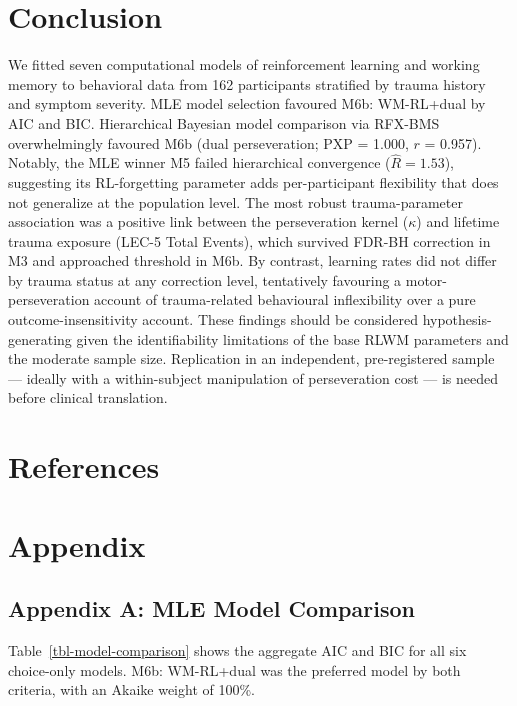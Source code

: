 \documentclass{article}
\begin{document}
\section{Conclusion}\label{sec-conclusion}

We fitted seven computational models of reinforcement learning and
working memory to behavioral data from 162 participants stratified by
trauma history and symptom severity. MLE model selection favoured M6b:
WM-RL+dual by AIC and BIC. Hierarchical Bayesian model comparison via
RFX-BMS overwhelmingly favoured M6b (dual perseveration; PXP = 1.000,
\(r\) = 0.957). Notably, the MLE winner M5 failed hierarchical
convergence (\(\hat{R} = 1.53\)), suggesting its RL-forgetting parameter
adds per-participant flexibility that does not generalize at the
population level. The most robust trauma-parameter association was a
positive link between the perseveration kernel (\(\kappa\)) and lifetime
trauma exposure (LEC-5 Total Events), which survived FDR-BH correction
in M3 and approached threshold in M6b. By contrast, learning rates did
not differ by trauma status at any correction level, tentatively
favouring a motor-perseveration account of trauma-related behavioural
inflexibility over a pure outcome-insensitivity account. These findings
should be considered hypothesis-generating given the identifiability
limitations of the base RLWM parameters and the moderate sample size.
Replication in an independent, pre-registered sample --- ideally with a
within-subject manipulation of perseveration cost --- is needed before
clinical translation.

\section*{References}\label{references}

\renewcommand{\bibsection}{}


\section{Appendix}\label{appendix}

\subsection{Appendix A: MLE Model
Comparison}\label{sec-model-comparison}

Table~\ref{tbl-model-comparison} shows the aggregate AIC and BIC for all
six choice-only models. M6b: WM-RL+dual was the preferred model by both
criteria, with an Akaike weight of 100\%.
\end{document}
